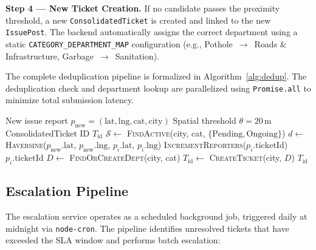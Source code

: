 \documentclass[conference]{IEEEtran}
\begin{document}
\textbf{Step 4 --- New Ticket Creation.} If no candidate passes the proximity threshold, a new \texttt{ConsolidatedTicket} is created and linked to the new \texttt{IssuePost}. The backend automatically assigns the correct department using a static \texttt{CATEGORY\_DEPARTMENT\_MAP} configuration (e.g., Pothole~$\rightarrow$~Roads \& Infrastructure, Garbage~$\rightarrow$~Sanitation).

The complete deduplication pipeline is formalized in Algorithm~\ref{alg:dedup}. The deduplication check and department lookup are parallelized using \texttt{Promise.all} to minimize total submission latency.

\begin{algorithm}[htbp]
\caption{Real-Time Spatial Deduplication}
\label{alg:dedup}
\begin{algorithmic}[1]
\REQUIRE New issue report $p_{\text{new}} = (\text{lat}, \text{lng}, \text{cat}, \text{city})$
\REQUIRE Spatial threshold $\theta = 20$\,m
\ENSURE ConsolidatedTicket ID $T_{\text{id}}$
\STATE $\mathcal{S} \leftarrow$ \textsc{FindActive}(city, cat, $\{\text{Pending}, \text{Ongoing}\}$)
    \STATE $d \leftarrow$ \textsc{Haversine}($p_{\text{new}}.\text{lat}$, $p_{\text{new}}.\text{lng}$, $p_i.\text{lat}$, $p_i.\text{lng}$)
        \STATE \textsc{IncrementReporters}($p_i.\text{ticketId}$)
        \RETURN $p_i.\text{ticketId}$
    \ENDIF
\ENDFOR
\STATE $D \leftarrow$ \textsc{FindOrCreateDept}(city, cat)
\STATE $T_{\text{id}} \leftarrow$ \textsc{CreateTicket}(city, $D$)
\RETURN $T_{\text{id}}$
\end{algorithmic}
\end{algorithm}

\subsection{Escalation Pipeline}

The escalation service operates as a scheduled background job, triggered daily at midnight via \texttt{node-cron}. The pipeline identifies unresolved tickets that have exceeded the SLA window and performs batch escalation:
\end{document}
